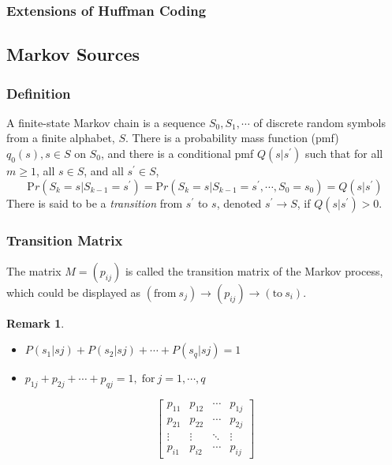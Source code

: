 \documentclass{article}
\newtheorem*{remark}{Remark}
\begin{document}
\subsubsection{Extensions of Huffman Coding}

\subsection{Markov Sources}

\subsubsection{Definition}

A finite-state Markov chain is a sequence $S_{0},S_{1}, \cdots$ of discrete random sym­bols from a finite alphabet, $S$. There is a probability mass function (pmf) $q_{0}(s), s \in S$ on $S_{0}$, and there is a conditional pmf $Q(s|s^{\prime})$ such that for all $m \geq 1$, all $s \in S$, and all $s^{\prime} \in S$,
    \[{\mathrm Pr}(S_{k}=s|S_{k-1}=s^{\prime})={\mathrm Pr}(S_{k}=s|S_{k-1}=s^{\prime},\cdots,S_{0}=s_{0})=Q(s|s^{\prime})\]
    There is said to be a \emph{transition} from $s^{\prime}$ to $s$, denoted $s^{\prime} \to S$, if $Q(s|s^{\prime})>0$. \cite{mitCh2}

\subsubsection{Transition Matrix}

The matrix $M = (p_{ij})$ is called the transition matrix of the Markov process, which could be displayed as $(\mathrm{from}\ s_{j}) \rightarrow (p_{ij}) \rightarrow (\mathrm{to}\ s_{i})$.

\begin{remark}
    \mbox{}
    \begin{itemize}
        \item \quad $P(s_{1}|s{j}) + P(s_{2}|s{j}) + \cdots + P(s_{q}|s{j}) = 1$
        \item \quad $p_{1j} + p_{2j} + \cdots + p_{qj} = 1, \; \mathrm{for}\ j = 1, \cdots, q$
    \end{itemize}
\end{remark}

\[
\begin{bmatrix}
    p_{11} & p_{12} & \cdots & p_{1j} \\
    p_{21} & p_{22} & \cdots & p_{2j} \\
    \vdots & \vdots & \ddots & \vdots \\
    p_{i1} & p_{i2} & \cdots & p_{ij}
\end{bmatrix}
\]
\end{document}
